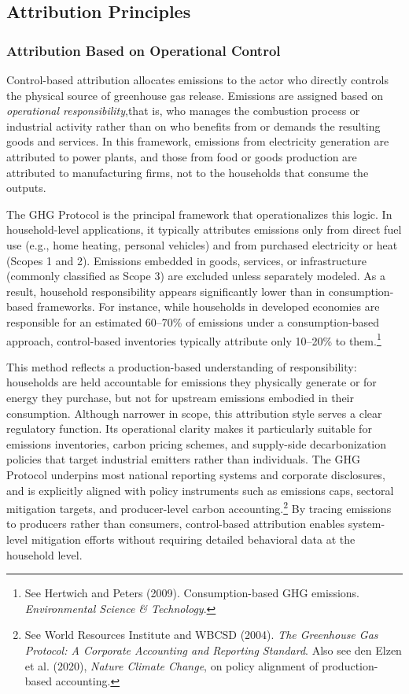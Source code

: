 \documentclass[12pt,a4paper]{article}%
\begin{document}
\subsection{Attribution Principles}

\subsubsection{Attribution Based on Operational Control}

Control-based attribution allocates emissions to the actor who directly controls the physical source of greenhouse gas release. Emissions are assigned based on \textit{operational responsibility},that is, who manages the combustion process or industrial activity rather than on who benefits from or demands the resulting goods and services. In this framework, emissions from electricity generation are attributed to power plants, and those from food or goods production are attributed to manufacturing firms, not to the households that consume the outputs.

The GHG Protocol is the principal framework that operationalizes this logic. In household-level applications, it typically attributes emissions only from direct fuel use (e.g., home heating, personal vehicles) and from purchased electricity or heat (Scopes 1 and 2). Emissions embedded in goods, services, or infrastructure (commonly classified as Scope 3) are excluded unless separately modeled. As a result, household responsibility appears significantly lower than in consumption-based frameworks. For instance, while households in developed economies are responsible for an estimated 60–70\% of emissions under a consumption-based approach, control-based inventories typically attribute only 10–20\% to them.\footnote{See Hertwich and Peters (2009). Consumption-based GHG emissions. \textit{Environmental Science \& Technology}.}

This method reflects a production-based understanding of responsibility: households are held accountable for emissions they physically generate or for energy they purchase, but not for upstream emissions embodied in their consumption. Although narrower in scope, this attribution style serves a clear regulatory function. Its operational clarity makes it particularly suitable for emissions inventories, carbon pricing schemes, and supply-side decarbonization policies that target industrial emitters rather than individuals. The GHG Protocol underpins most national reporting systems and corporate disclosures, and is explicitly aligned with policy instruments such as emissions caps, sectoral mitigation targets, and producer-level carbon accounting.\footnote{See World Resources Institute and WBCSD (2004). \textit{The Greenhouse Gas Protocol: A Corporate Accounting and Reporting Standard}. Also see den Elzen et al. (2020), \textit{Nature Climate Change}, on policy alignment of production-based accounting.} By tracing emissions to producers rather than consumers, control-based attribution enables system-level mitigation efforts without requiring detailed behavioral data at the household level.
\end{document}
